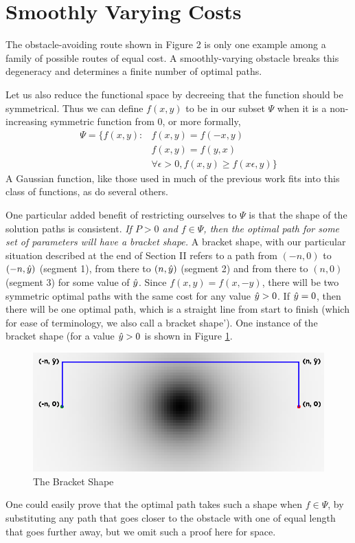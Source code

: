 \section{Smoothly Varying Costs}
The obstacle-avoiding route shown in Figure 2 is only one example among a family of possible routes of equal cost. A smoothly-varying obstacle breaks this degeneracy and determines a finite number of optimal paths.

Let us also reduce the functional space by decreeing that the function should be symmetrical. Thus we can define $f(x,y)$ to be in our subset $\Psi$ when it is a non-increasing symmetric function from 0, or more formally, 
\begin{align*}
\Psi = \{ f(x,y) : & f(x,y)=f(-x,y)\\
 & f(x,y)=f(y,x) \\
 & \forall \epsilon>0, f(x,y) \ge f(x\epsilon, y) \}
\end{align*}
 A Gaussian function, like those used in much of the previous work fits into this class of functions, as do several others. 

One particular added benefit of restricting ourselves to $\Psi$ is that the shape of the solution paths is consistent. \emph{If $P>0$ and $f\in\Psi$, then the optimal path for some set of parameters will have a bracket shape.} A bracket shape, with our particular situation described at the end of Section II refers to a path from $(-n,0)$ to $(-n, \hat{y})$ (segment 1), from there to $(n, \hat{y})$ (segment 2) and from there to $(n,0)$ (segment 3) for some value of $\hat{y}$. Since $f(x,y)=f(x,-y)$, there will be two symmetric optimal paths with the same cost for any value $\hat{y}>0$. If $\hat{y}=0$, then there will be one optimal path, which is a straight line from start to finish (which for ease of terminology, we also call a bracket shape'). One instance of the bracket shape (for a value $\hat{y} > 0 $ is shown in Figure \ref{fig:bracket}. 

\begin{figure}
\includegraphics[width=\columnwidth]{graphix/bracket.png}
\caption{The Bracket Shape}
\label{fig:bracket}
\end{figure}

One could easily prove that the optimal path takes such a shape when $f\in\Psi$, by substituting any path that goes closer to the obstacle with one of equal length that goes further away, but we omit such a proof here for space. 


